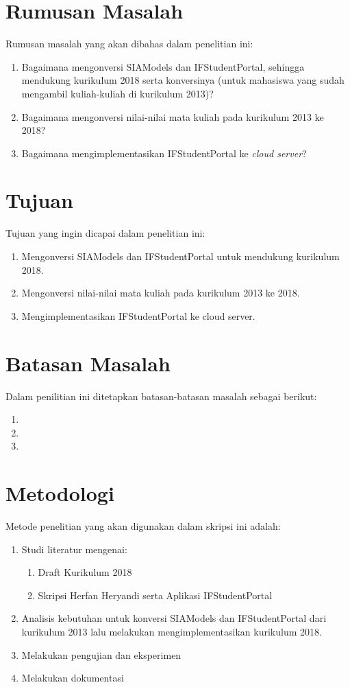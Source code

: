 \section{Rumusan Masalah}
\label{sec:rumusan}
Rumusan masalah yang akan dibahas dalam penelitian ini:
\begin{enumerate}
	\item Bagaimana mengonversi SIAModels dan IFStudentPortal, sehingga mendukung kurikulum 2018 serta konversinya (untuk mahasiswa yang sudah mengambil kuliah-kuliah di kurikulum 2013)?
	\item Bagaimana mengonversi nilai-nilai mata kuliah pada kurikulum 2013 ke 2018?
	\item Bagaimana mengimplementasikan IFStudentPortal ke \textit{cloud server}?
\end{enumerate}

\section{Tujuan}
\label{sec:tujuan}
Tujuan yang ingin dicapai dalam penelitian ini:
\begin{enumerate}
	\item Mengonversi SIAModels dan IFStudentPortal untuk mendukung kurikulum 2018.
	\item Mengonversi nilai-nilai mata kuliah pada kurikulum 2013 ke 2018.
	\item Mengimplementasikan IFStudentPortal ke cloud server.
\end{enumerate}

\section{Batasan Masalah}
\label{sec:batasan}
Dalam penilitian ini ditetapkan batasan-batasan masalah sebagai berikut:
\begin{enumerate}
	\item 
	\item 
	\item
\end{enumerate}

\section{Metodologi}
\label{sec:metlit}
Metode penelitian yang akan digunakan dalam skripsi ini adalah:
\begin{enumerate}
	\item Studi literatur mengenai:
	\begin{enumerate}
		\item Draft Kurikulum 2018
		\item Skripsi Herfan Heryandi serta Aplikasi IFStudentPortal
	\end{enumerate}
	\item Analisis kebutuhan untuk konversi SIAModels dan IFStudentPortal dari kurikulum 2013 lalu melakukan mengimplementasikan kurikulum 2018.
	\item Melakukan pengujian dan eksperimen
	\item Melakukan dokumentasi
	
\end{enumerate}

